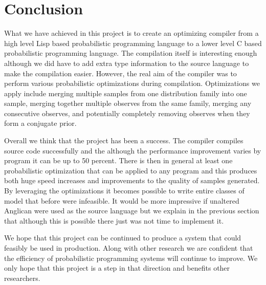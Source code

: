 \documentclass[a4paper]{article}
\begin{document}

\section{Conclusion}

What we have achieved in this project is to create an optimizing compiler from a high level Lisp based probabilistic programming language to a lower level C based probabilistic programming language. The compilation itself is interesting enough although we did have to add extra type information to the source language to make the compilation easier. However, the real aim of the compiler was to perform various probabilistic optimizations during compilation. Optimizations we apply include merging multiple samples from one distribution family into one sample, merging together multiple observes from the same family, merging any consecutive observes, and potentially completely removing observes when they form a conjugate prior.

Overall we think that the project has been a success. The compiler compiles source code successfully and the although the performance improvement varies by program it can be up to 50 percent. There is then in general at least one probabilistic optimization that can be applied to any program and this produces both huge speed increases and improvements to the quality of samples generated. By leveraging the optimizations it becomes possible to write entire classes of model that before were infeasible. It would be more impressive if unaltered Anglican were used as the source language but we explain in the previous section that although this is possible there just was not time to implement it.

We hope that this project can be continued to produce a system that could feasibly be used in production. Along with other research we are confident that the efficiency of probabilistic programming systems will continue to improve. We only hope that this project is a step in that direction and benefits other researchers.



{}

\end{document}
